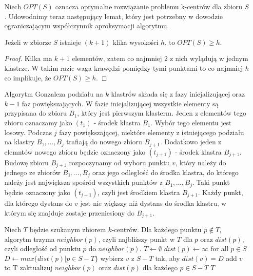 \noindent
Niech $OPT(S)$ oznacza optymalne rozwiązanie problemu k-centrów dla zbioru $S$.
Udowodnimy teraz następujący lemat, który jest potrzebny w dowodzie ograniczającym współczynnik aproksymacji algorytmu.

\begin{lemma}\cite{Gonzalez1985ClusteringTM}
    Jeżeli w zbiorze $S$ istnieje $(k+1)$ klika wysokości $h$, to $OPT(S) \geq h$.
\end{lemma}

\begin{proof}
    Kilka ma $k+1$ elementów, zatem co najmniej $2$ z nich wylądują w jednym klastrze.
    W takim razie waga krawędzi pomiędzy tymi punktami to co najmniej $h$ co implikuje, że $OPT(S) \geq h$.
\end{proof}

\noindent
Algorytm Gonzaleza podziału na $k$ klastrów składa się z fazy inicjalizującej oraz $k-1$ faz powiększających.
W fazie inicjalizującej wszystkie elementy są przypisana do zbioru $B_{1}$, który jest pierwszym klasterm.
Jeden z elementów tego zbioru oznaczamy jako $(t_{1})$ - środek klastra $B_{1}$.
Wybór tego elementu jest losowy.
Podczas $j$ fazy powiększającej, niektóre elementy z istniejącego podziału na klastry $B_{1}, \dots, B_{j}$ trafiają do nowego zbioru $B_{j+1}$.
Dodatkowo jeden z elemntów nowego zbioru będzie oznaczony jako $(t_{j+1})$ - środek klastra $B_{j+1}$.
Budowę zbioru $B_{j+1}$ rozpoczynamy od wyboru punktu $v$, który należy do jednego ze zbiorów $B_{1}, \dots, B_{j}$ oraz jego odległość do środka klastra, do którego należy jest największa spośród wszystkich punktów z $B_{1}, \dots, B_{j}$. 
Taki punkt będzie oznaczony jako $(t_{j+1})$, czyli jest środkiem klastra $B_{j+1}$.
Każdy punkt, dla którego dystans do $v$ jest nie większy niż dystans do środka klastru, w którym się znajduje zostaje przeniesiony do $B_{j+1}$.
\begin{algorithm}
    \caption{}
\begin{algorithmic}
    \State Niech $T$ będzie szukanym zbiorem $k$-centrów.
    \State Dla każdego punktu $p \notin T$, algorytm trzyma $neighbor(p)$, czyli najbliższy punkt w $T$ dla $p$ oraz $dist(p)$, czyli odległość od punktu $p$ do $neighbor(p)$.
        \State $T \leftarrow \emptyset$
        \State $dist(p) \leftarrow \infty$ for all $p \in S$
            \State $D \leftarrow max\{dist(p) | p \in S-T\}$
            \State wybierz $v$ z $S-T$ tak, aby $dist(v) = D$
            \State add $v$ to T
            \State zaktualizuj $neighbor(p)$ oraz $dist(p)$ dla każdego $p \in S-T$
        \EndWhile
    \EndProcedure
    \Return $T$
\end{algorithmic}
\end{algorithm}
